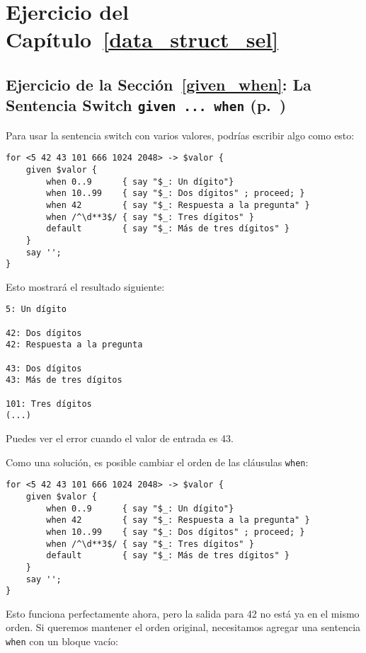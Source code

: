 \section{Ejercicio del Capítulo~\ref{data_struct_sel}}

\subsection{Ejercicio de la Sección~\ref{given_when}: La Sentencia Switch {\tt given ... when}  (p.~\pageref{proceed_ex})}
\label{sol_proceed_ex}

Para usar la sentencia switch con varios valores, podrías
escribir algo como esto:

\begin{verbatim}
for <5 42 43 101 666 1024 2048> -> $valor {
    given $valor {
        when 0..9      { say "$_: Un dígito"}
        when 10..99    { say "$_: Dos dígitos" ; proceed; }
        when 42        { say "$_: Respuesta a la pregunta" }
        when /^\d**3$/ { say "$_: Tres dígitos" }
        default        { say "$_: Más de tres dígitos" }
    }
    say '';
}
\end{verbatim}

Esto mostrará el resultado siguiente:

\begin{verbatim}
5: Un dígito

42: Dos dígitos
42: Respuesta a la pregunta

43: Dos dígitos
43: Más de tres dígitos

101: Tres dígitos
(...)
\end{verbatim}

Puedes ver el error cuando el valor de entrada es 43.

Como una solución, es posible cambiar el orden de las cláusulas
{\tt when}:

\begin{verbatim}
for <5 42 43 101 666 1024 2048> -> $valor {
    given $valor {
        when 0..9      { say "$_: Un dígito"}
        when 42        { say "$_: Respuesta a la pregunta" }
        when 10..99    { say "$_: Dos dígitos" ; proceed; }
        when /^\d**3$/ { say "$_: Tres dígitos" }
        default        { say "$_: Más de tres dígitos" }
    }
    say '';
}
\end{verbatim}

Esto funciona perfectamente ahora, pero la salida para 42 
no está ya en el mismo orden. Si queremos mantener el orden 
original, necesitamos agregar una sentencia {\tt when} con
un bloque vacío:

